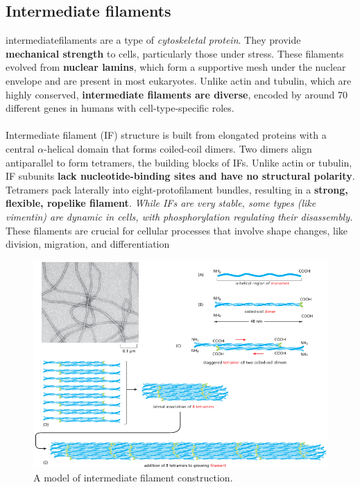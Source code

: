 \documentclass[../main.tex]{subfiles}
\begin{document}
\subsection{Intermediate filaments}

\gls{intermediatefilaments} are a type of \textit{cytoskeletal protein}. They provide \textbf{mechanical strength} to cells, particularly those under stress. These filaments evolved from \textbf{nuclear lamins}, which form a supportive mesh under the nuclear envelope and are present in most eukaryotes. Unlike actin and tubulin, which are highly conserved, \textbf{intermediate filaments are diverse}, encoded by around 70 different genes in humans with cell-type-specific roles.\\
\\
Intermediate filament (IF) structure is built from elongated proteins with a central $\alpha$-helical domain that forms coiled-coil dimers. Two dimers align antiparallel to form tetramers, the building blocks of IFs. Unlike actin or tubulin, IF subunits \textbf{lack nucleotide-binding sites and have no structural polarity}. Tetramers pack laterally into eight-protofilament bundles, resulting in a \textbf{strong, flexible, ropelike filament}. \textit{While IFs are very stable, some types (like vimentin) are dynamic in cells, with phosphorylation regulating their disassembly.} \\
\indent These filaments are crucial for cellular processes that involve shape changes, like division, migration, and differentiation

\begin{figure}[H]
	\centering
	\includegraphics[width = 0.9 \textwidth]{40}
	\caption{A model of intermediate filament construction.}
\end{figure}
\end{document}
